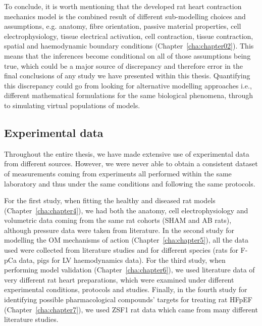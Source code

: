 \vspace{0.2cm}
To conclude, it is worth mentioning that the developed rat heart contraction mechanics model is the combined result of different sub-modelling choices and assumptions, e.g. anatomy, fibre orientation, passive material properties, cell electrophysiology, tissue electrical activation, cell contraction, tissue contraction, spatial and haemodynamic boundary conditions (Chapter~\ref{cha:chapter02}). This means that the inferences become conditional on all of those assumptions being true, which could be a major source of discrepancy and therefore error in the final conclusions of any study we have presented within this thesis. Quantifying this discrepancy could go from looking for alternative modelling approaches i.e., different mathematical formulations for the same biological phenomena, through to simulating virtual populations of models.

%
%
%
\subsection{Experimental data}\label{sec:ch9experimental_data}
Throughout the entire thesis, we have made extensive use of experimental data from different sources. However, we were never able to obtain a consistent dataset of measurements coming from experiments all performed within the same laboratory and thus under the same conditions and following the same protocols.

\vspace{0.2cm}
For the first study, when fitting the healthy and diseased rat models (Chapter~\ref{cha:chapter4}), we had both the anatomy, cell electrophysiology and volumetric data coming from the same rat cohorts (SHAM and AB rats), although pressure data were taken from literature. In the second study for modelling the OM mechanisms of action (Chapter~\ref{cha:chapter5}), all the data used were collected from literature studies and for different species (rats for F-pCa data, pigs for LV haemodynamics data). For the third study, when performing model validation (Chapter~\ref{cha:chapter6}), we used literature data of very different rat heart preparations, which were examined under different experimental conditions, protocols and studies. Finally, in the fourth study for identifying possible pharmacological compounds' targets for treating rat HFpEF (Chapter~\ref{cha:chapter7}), we used ZSF1 rat data which came from many different literature studies.

